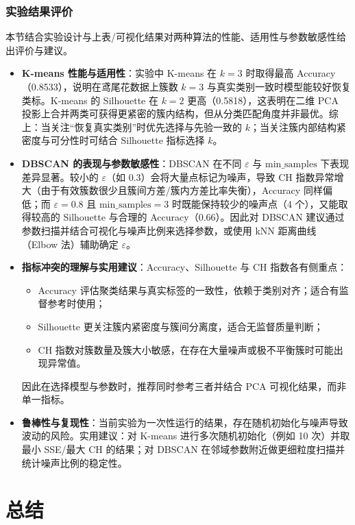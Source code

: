 \subsection{实验结果评价}
本节结合实验设计与上表/可视化结果对两种算法的性能、适用性与参数敏感性给出评价与建议。

\begin{itemize}
    \item \textbf{K-means 性能与适用性}：实验中 K-means 在 $k=3$ 时取得最高 Accuracy（0.8533），说明在鸢尾花数据上簇数 $k=3$ 与真实类别一致时模型能较好恢复类标。K-means 的 Silhouette 在 $k=2$ 更高（0.5818），这表明在二维 PCA 投影上合并两类可获得更紧密的簇内结构，但从分类匹配角度并非最优。综上：当关注“恢复真实类别”时优先选择与先验一致的 $k$；当关注簇内部结构紧密度与可分性时可结合 Silhouette 指标选择 $k$。

    \item \textbf{DBSCAN 的表现与参数敏感性}：DBSCAN 在不同 $\varepsilon$ 与 $\mathrm{min\_samples}$ 下表现差异显著。较小的 $\varepsilon$（如 0.3）会将大量点标记为噪声，导致 CH 指数异常增大（由于有效簇数很少且簇间方差/簇内方差比率失衡），Accuracy 同样偏低；而 $\varepsilon=0.8$ 且 $\mathrm{min\_samples}=3$ 时既能保持较少的噪声点（4 个），又能取得较高的 Silhouette 与合理的 Accuracy（0.66）。因此对 DBSCAN 建议通过参数扫描并结合可视化与噪声比例来选择参数，或使用 kNN 距离曲线（Elbow 法）辅助确定 $\varepsilon$。

    \item \textbf{指标冲突的理解与实用建议}：Accuracy、Silhouette 与 CH 指数各有侧重点：
    \begin{itemize}
        \item Accuracy 评估聚类结果与真实标签的一致性，依赖于类别对齐；适合有监督参考时使用；
        \item Silhouette 更关注簇内紧密度与簇间分离度，适合无监督质量判断；
        \item CH 指数对簇数量及簇大小敏感，在存在大量噪声或极不平衡簇时可能出现异常值。
    \end{itemize}
    因此在选择模型与参数时，推荐同时参考三者并结合 PCA 可视化结果，而非单一指标。

    \item \textbf{鲁棒性与复现性}：当前实验为一次性运行的结果，存在随机初始化与噪声导致波动的风险。实用建议：对 K-means 进行多次随机初始化（例如 10 次）并取最小 SSE/最大 CH 的结果；对 DBSCAN 在邻域参数附近做更细粒度扫描并统计噪声比例的稳定性。
\end{itemize}

\chapter{总结}


